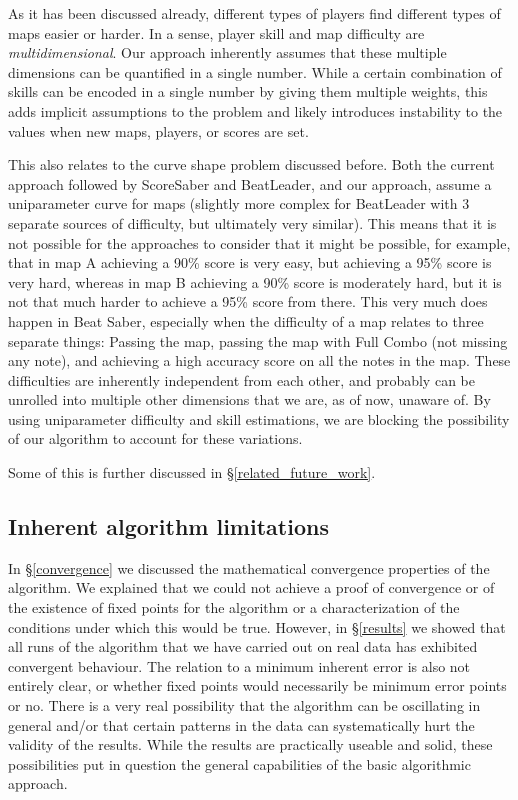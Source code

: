 \documentclass[12pt,a4paper]{article}
\begin{document}
As it has been discussed already, different types of players find different types of maps easier or harder. In a sense, player skill and map difficulty are {\emph{multidimensional}}. Our approach inherently assumes that these multiple dimensions can be quantified in a single number. While a certain combination of skills can be encoded in a single number by giving them multiple weights, this adds implicit assumptions to the problem and likely introduces instability to the values when new maps, players, or scores are set.

This also relates to the curve shape problem discussed before. Both the current approach followed by ScoreSaber and BeatLeader, and our approach, assume a uniparameter curve for maps (slightly more complex for BeatLeader with 3 separate sources of difficulty, but ultimately very similar). This means that it is not possible for the approaches to consider that it might be possible, for example, that in map A achieving a 90\% score is very easy, but achieving a 95\% score is very hard, whereas in map B achieving a 90\% score is moderately hard, but it is not that much harder to achieve a 95\% score from there. This very much does happen in Beat Saber, especially when the difficulty of a map relates to three separate things: Passing the map, passing the map with Full Combo (not missing any note), and achieving a high accuracy score on all the notes in the map. These difficulties are inherently independent from each other, and probably can be unrolled into multiple other dimensions that we are, as of now, unaware of. By using uniparameter difficulty and skill estimations, we are blocking the possibility of our algorithm to account for these variations.

Some of this is further discussed in \S \ref{related_future_work}.

\subsection{Inherent algorithm limitations}
\label{inherent_algorithm_limitations}

In \S \ref{convergence} we discussed the mathematical convergence properties of the algorithm. We explained that we could not achieve a proof of convergence or of the existence of fixed points for the algorithm or a characterization of the conditions under which this would be true. However, in \S \ref{results} we showed that all runs of the algorithm that we have carried out on real data has exhibited convergent behaviour. The relation to a minimum inherent error is also not entirely clear, or whether fixed points would necessarily be minimum error points or no. There is a very real possibility that the algorithm can be oscillating in general and/or that certain patterns in the data can systematically hurt the validity of the results. While the results are practically useable and solid, these possibilities put in question the general capabilities of the basic algorithmic approach.
\end{document}
